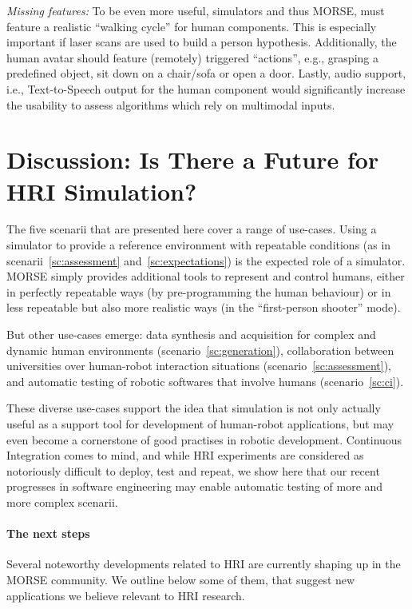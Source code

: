 \documentclass[conference]{IEEEtran}
\begin{document}
\emph{Missing features:} To be even more useful, simulators and thus MORSE, must
feature a realistic ``walking cycle'' for human components. This is especially
important if laser scans are used to build a person hypothesis. Additionally, the
human avatar should feature (remotely) triggered ``actions'', e.g., grasping a 
predefined object, sit down on a chair/sofa or open a door. Lastly, audio support, 
i.e., Text-to-Speech output for the human component would significantly increase
the usability to assess algorithms which rely on multimodal inputs.  

\section{Discussion: Is There a Future for HRI Simulation?}

The five scenarii that are presented here cover a range of use-cases. Using a
simulator to provide a reference environment with repeatable conditions (as in
scenarii~\ref{sc:assessment} and~\ref{sc:expectations}) is the expected role of
a simulator. MORSE simply provides additional tools to represent and control
humans, either in perfectly repeatable ways (by pre-programming the human
behaviour) or in less repeatable but also more realistic ways (in the
``first-person shooter'' mode).

But other use-cases emerge: data synthesis and acquisition for complex and
dynamic human environments (scenario~\ref{sc:generation}), collaboration between
universities over human-robot interaction situations
(scenario~\ref{sc:assessment}), and automatic testing of robotic softwares that
involve humans (scenario~\ref{sc:ci}).

These diverse use-cases support the idea that simulation is not only actually
useful as a support tool for development of human-robot applications, but may
even become a cornerstone of good practises in robotic development. Continuous
Integration comes to mind, and while HRI experiments are considered as
notoriously difficult to deploy, test and repeat, we show here that our recent
progresses in software engineering may enable automatic testing of more and more
complex scenarii.

\paragraph*{The next steps}

Several noteworthy developments related to HRI are currently shaping up in the
MORSE community. We outline below some of them, that suggest new applications we
believe relevant to HRI research.
\end{document}
